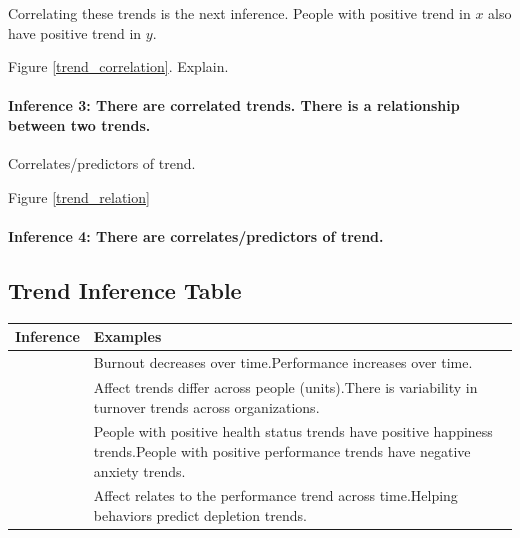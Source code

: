 \documentclass[english,,man]{apa6}
\let\oldparagraph\paragraph
\renewcommand{\paragraph}[1]{\oldparagraph{#1}\mbox{}}
\theoremstyle{definition}
\theoremstyle{definition}
\theoremstyle{definition}
\theoremstyle{remark}
\begin{document}
Correlating these trends is the next inference. People with positive
trend in \(x\) also have positive trend in \(y\).

Figure \ref{trend_correlation}. Explain.

\hypertarget{inference-3-there-are-correlated-trends.-there-is-a-relationship-between-two-trends.}{%
\paragraph{Inference 3: There are correlated trends. There is a
relationship between two
trends.}\label{inference-3-there-are-correlated-trends.-there-is-a-relationship-between-two-trends.}}

Correlates/predictors of trend.

Figure \ref{trend_relation}

\hypertarget{inference-4-there-are-correlatespredictors-of-trend.}{%
\paragraph{Inference 4: There are correlates/predictors of
trend.}\label{inference-4-there-are-correlatespredictors-of-trend.}}

\hypertarget{trend-inference-table}{%
\subsection{Trend Inference Table}\label{trend-inference-table}}

\begin{tabular}{>{\raggedright\arraybackslash}p{5em}>{\raggedright\arraybackslash}p{30em}}
\toprule
Inference & Examples\\
\midrule
1 & Burnout decreases over time.\newline Performance increases over time.\\
\hline
2 & Affect trends differ across people (units).\newline There is variability in turnover trends across organizations.\\
\hline
3 & People with positive health status trends have positive happiness trends.\newline People with positive performance trends have negative anxiety trends.\\
\hline
4 & Affect relates to the performance trend across time.\newline Helping behaviors predict depletion trends.\\
\bottomrule
\end{tabular}
\end{document}
